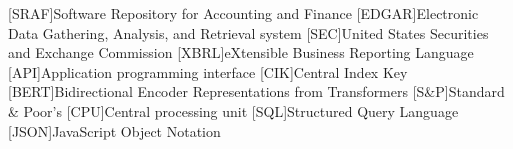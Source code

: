 \begin{acronym}[EDGAR]
    [SRAF]{Software Repository for Accounting and Finance}
    [EDGAR]{Electronic Data Gathering, Analysis, and Retrieval system}
    [SEC]{United States Securities and Exchange Commission}
    [XBRL]{eXtensible Business Reporting Language}
    [API]{Application programming interface}
    [CIK]{Central Index Key}
    [BERT]{Bidirectional Encoder Representations from Transformers}
    [S\&P]{Standard \& Poor’s}
    [CPU]{Central processing unit}
    [SQL]{Structured Query Language}
    [JSON]{JavaScript Object Notation}
\end{acronym}